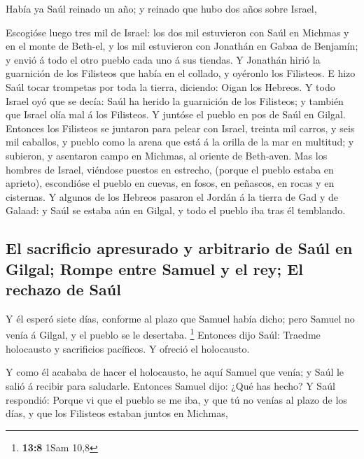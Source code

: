 Había ya Saúl reinado un año; y reinado que hubo dos años
sobre Israel,

 Escogióse luego tres mil de Israel: los dos mil
estuvieron con Saúl en Michmas y en el monte de Beth-el, y los mil
estuvieron con Jonathán en Gabaa de Benjamín; y envió á todo el otro
pueblo cada uno á sus tiendas.  Y Jonathán hirió la
guarnición de los Filisteos que había en el collado, y oyéronlo los
Filisteos. E hizo Saúl tocar trompetas por toda la tierra, diciendo:
Oigan los Hebreos.  Y todo Israel oyó que se decía: Saúl
ha herido la guarnición de los Filisteos; y también que Israel olía mal
á los Filisteos. Y juntóse el pueblo en pos de Saúl en Gilgal.
 Entonces los Filisteos se juntaron para pelear con
Israel, treinta mil carros, y seis mil caballos, y pueblo como la arena
que está á la orilla de la mar en multitud; y subieron, y asentaron
campo en Michmas, al oriente de Beth-aven.  Mas los
hombres de Israel, viéndose puestos en estrecho, (porque el pueblo
estaba en aprieto), escondióse el pueblo en cuevas, en fosos, en
peñascos, en rocas y en cisternas.  Y algunos de los
Hebreos pasaron el Jordán á la tierra de Gad y de Galaad: y Saúl se
estaba aún en Gilgal, y todo el pueblo iba tras él temblando.

\hypertarget{el-sacrificio-apresurado-y-arbitrario-de-sauxfal-en-gilgal-rompe-entre-samuel-y-el-rey-el-rechazo-de-sauxfal}{%
\subsection{El sacrificio apresurado y arbitrario de Saúl en Gilgal;
Rompe entre Samuel y el rey; El rechazo de
Saúl}\label{el-sacrificio-apresurado-y-arbitrario-de-sauxfal-en-gilgal-rompe-entre-samuel-y-el-rey-el-rechazo-de-sauxfal}}

 Y él esperó siete días, conforme al plazo que Samuel
había dicho; pero Samuel no venía á Gilgal, y el pueblo se le desertaba.
\footnote{\textbf{13:8} 1Sam 10,8}  Entonces dijo Saúl:
Traedme holocausto y sacrificios pacíficos. Y ofreció el holocausto.

 Y como él acababa de hacer el holocausto, he aquí Samuel
que venía; y Saúl le salió á recibir para saludarle. 
Entonces Samuel dijo: ¿Qué has hecho? Y Saúl respondió: Porque vi que el
pueblo se me iba, y que tú no venías al plazo de los días, y que los
Filisteos estaban juntos en Michmas,

